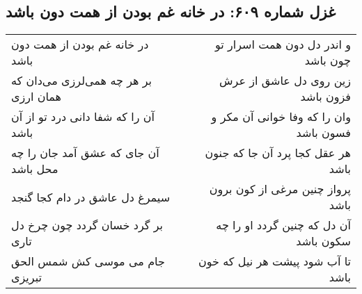 \begin{center}
\section*{غزل شماره ۶۰۹: در خانه غم بودن از همت دون باشد}
\label{sec:0609}
\begin{longtable}{l p{0.5cm} r}
در خانه غم بودن از همت دون باشد
&&
و اندر دل دون همت اسرار تو چون باشد
\\
بر هر چه همی‌لرزی می‌دان که همان ارزی
&&
زین روی دل عاشق از عرش فزون باشد
\\
آن را که شفا دانی درد تو از آن باشد
&&
وان را که وفا خوانی آن مکر و فسون باشد
\\
آن جای که عشق آمد جان را چه محل باشد
&&
هر عقل کجا پرد آن جا که جنون باشد
\\
سیمرغ دل عاشق در دام کجا گنجد
&&
پرواز چنین مرغی از کون برون باشد
\\
بر گرد خسان گردد چون چرخ دل تاری
&&
آن دل که چنین گردد او را چه سکون باشد
\\
جام می موسی کش شمس الحق تبریزی
&&
تا آب شود پیشت هر نیل که خون باشد
\\
\end{longtable}
\end{center}
